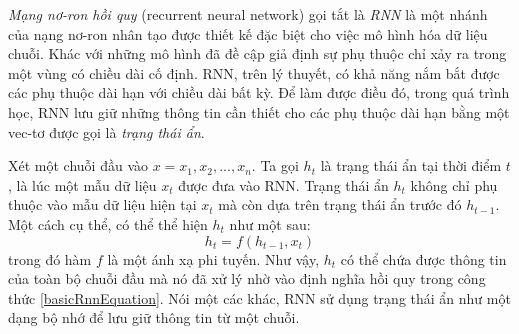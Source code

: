 \textit{Mạng nơ-ron hồi quy} (recurrent neural network) \cite{elman1990} gọi tắt là \textit{RNN} là một nhánh của nạng nơ-ron nhân tạo được thiết kế đặc biệt cho việc mô hình hóa dữ liệu chuỗi. Khác với những mô hình đã đề cập giả định sự phụ thuộc chỉ xảy ra trong một vùng có chiều dài cố định. RNN, trên lý thuyết, có khả năng nắm bắt được các phụ thuộc dài hạn với chiều dài bất kỳ. Để làm được điều đó, trong quá trình học, RNN lưu giữ những thông tin cần thiết cho các phụ thuộc dài hạn bằng một vec-tơ được gọi là \textit{trạng thái ẩn}.

Xét một chuỗi đầu vào $x={x_1,x_2,...,x_n}$. Ta gọi $h_t$ là trạng thái ẩn tại thời điểm $t$, là lúc một mẫu dữ liệu $x_t$ được đưa vào RNN. Trạng thái ẩn $h_t$ không chỉ phụ thuộc vào mẫu dữ liệu hiện tại $x_t$ mà còn dựa trên trạng thái ẩn trước đó $h_{t-1}$. Một cách cụ thể, có thể thể hiện $h_t$ như một sau:
\begin{equation} \label{basicRnnEquation}
	h_t = f \left(h_{t-1}, x_t \right)
\end{equation}
trong đó hàm $f$ là một ánh xạ phi tuyến. Như vậy, $h_t$ có thể chứa được thông tin của toàn bộ chuỗi đầu mà nó đã xử lý nhờ vào định nghĩa hồi quy trong công thức \ref{basicRnnEquation}. Nói một các khác, RNN sử dụng trạng thái ẩn như một dạng bộ nhớ để lưu giữ thông tin từ một chuỗi.



